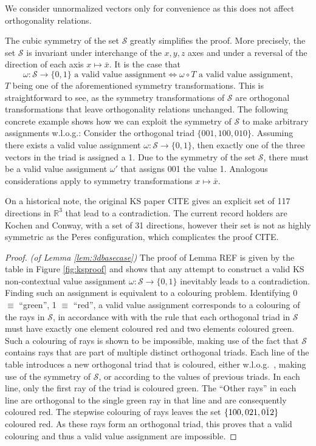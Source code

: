 We consider unnormalized vectors only for convenience as this does not affect orthogonality relations. 

The cubic symmetry of the set $\mathcal{S}$ greatly simplifies the proof. More precisely, the set $\mathcal{S}$ is invariant under interchange of the $x,y,z$ axes and under a reversal of the direction of each axis $x\mapsto\bar{x}$. It is the case that \begin{equation*}
\omega:\mathbb{\mathcal{S}\rightarrow}\{0,1\}\text{ a valid value assignment}\iff\omega\circ T\text{ a valid value assignment,}\end{equation*}
$T$ being one of the aforementioned symmetry transformations. This is straightforward to see, as the symmetry transformations of $\mathcal{S}$ are orthogonal transformations that leave orthogonality relations unchanged. The following concrete example shows how we can exploit the symmetry of $\mathcal{S}$ to make arbitrary assignments w.l.o.g.: Consider the orthogonal triad $\{001,100,010\}$. Assuming there exists a valid value assignment $\omega:\mathbb{\mathcal{S}\rightarrow}\{0,1\}$, then exactly one of the three vectors in the triad is assigned a 1. Due to the symmetry of the set $\mathcal{
S}$, there must be a valid value assignment $\omega'$ that assigns 001 the value 1. Analogous considerations apply to symmetry transformations $x\mapsto\bar{x}$. 

On a historical note, the original KS paper CITE gives an explicit set of 117 directions in $\mathbb{R}^{3}$ that lead to a contradiction. The current record holders are Kochen and Conway, with a set of 31 directions, however their set is not as highly symmetric as the Peres configuration, which complicates the proof CITE.

\begin{proof} \emph{(of Lemma \ref{lem:3dbasecase})}\hfil\break
The proof of Lemma REF is given by the table in Figure \ref{fig:ksproof} and shows that any attempt to construct a valid KS non-contextual value assignment $\omega:\mathbb{\mathcal{S}\rightarrow}\{0,1\}$ inevitably leads to a contradiction. Finding such an assignment is equivalent to a colouring problem. Identifying 0 $\equiv$ ``green'', 1 $\equiv$ ``red'', a valid value assignment corresponds to a colouring of the rays in $\mathcal{S}$, in accordance with with the rule that each orthogonal triad in $\mathcal{S}$ must have exactly one element coloured red and two elements coloured green. Such a colouring of rays is shown to be impossible, making use of the fact that $\mathcal{S}$ contains rays that are part of multiple distinct orthogonal triads. Each line of the table introduces a new orthogonal triad that is coloured, either w.l.o.g.\ , making use of the symmetry of $\mathcal{S}$, or according to the values of previous triads. In each line, only the first ray of the triad is coloured green. The “Other rays” in each line are orthogonal to the single green ray in that line and are consequently coloured red. The stepwise colouring of rays leaves the set $\{100,021,0\text{\ensuremath{\bar{1}}2}\}$ coloured red. As these rays form an orthogonal triad, this proves that a valid colouring and thus a valid value assignment are impossible.
\end{proof}

